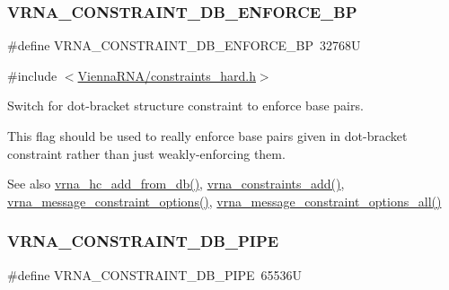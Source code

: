 \subsubsection{\texorpdfstring{V\+R\+N\+A\+\_\+\+C\+O\+N\+S\+T\+R\+A\+I\+N\+T\+\_\+\+D\+B\+\_\+\+E\+N\+F\+O\+R\+C\+E\+\_\+\+BP}{VRNA\_CONSTRAINT\_DB\_ENFORCE\_BP}}
{\footnotesize\ttfamily \#define V\+R\+N\+A\+\_\+\+C\+O\+N\+S\+T\+R\+A\+I\+N\+T\+\_\+\+D\+B\+\_\+\+E\+N\+F\+O\+R\+C\+E\+\_\+\+BP~32768U}



{\ttfamily \#include $<$\mbox{\hyperlink{constraints__hard_8h}{Vienna\+R\+N\+A/constraints\+\_\+hard.\+h}}$>$}



Switch for dot-\/bracket structure constraint to enforce base pairs. 

This flag should be used to really enforce base pairs given in dot-\/bracket constraint rather than just weakly-\/enforcing them.

\begin{DoxySeeAlso}{See also}
\mbox{\hyperlink{group__hard__constraints_ga5b4de3247b67358080c176b94591a8e6}{vrna\+\_\+hc\+\_\+add\+\_\+from\+\_\+db()}}, \mbox{\hyperlink{group__constraints_ga35a401f680969a556858a8dd5f1d07cc}{vrna\+\_\+constraints\+\_\+add()}}, \mbox{\hyperlink{group__constraints_gaa1f20b53bf09ac2e6b0dbb13f7d89670}{vrna\+\_\+message\+\_\+constraint\+\_\+options()}}, \mbox{\hyperlink{group__constraints_gaec7e13fa0465c2acc7a621d1aecb709f}{vrna\+\_\+message\+\_\+constraint\+\_\+options\+\_\+all()}} 
\end{DoxySeeAlso}
\mbox{\label{group__hard__constraints_ga13053547a2de5532b64b64d35e097ae1}} 
\subsubsection{\texorpdfstring{V\+R\+N\+A\+\_\+\+C\+O\+N\+S\+T\+R\+A\+I\+N\+T\+\_\+\+D\+B\+\_\+\+P\+I\+PE}{VRNA\_CONSTRAINT\_DB\_PIPE}}
{\footnotesize\ttfamily \#define V\+R\+N\+A\+\_\+\+C\+O\+N\+S\+T\+R\+A\+I\+N\+T\+\_\+\+D\+B\+\_\+\+P\+I\+PE~65536U}



